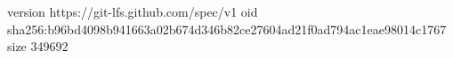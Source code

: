 version https://git-lfs.github.com/spec/v1
oid sha256:b96bd4098b941663a02b674d346b82ce27604ad21f0ad794ac1eae98014c1767
size 349692
